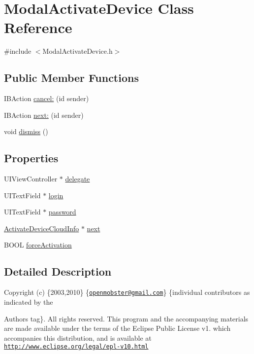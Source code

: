 \hypertarget{interface_modal_activate_device}{
\section{\-Modal\-Activate\-Device \-Class \-Reference}
\label{interface_modal_activate_device}
}


{\ttfamily \#include $<$\-Modal\-Activate\-Device.\-h$>$}

\subsection*{\-Public \-Member \-Functions}
\begin{DoxyCompactItemize}
\item 
\-I\-B\-Action \hyperlink{interface_modal_activate_device_aa6a7dcf6e0b7b5464b1462e3bd6d689f}{cancel\-:} (id sender)
\item 
\-I\-B\-Action \hyperlink{interface_modal_activate_device_a881ebe114bb256df2fab429ffab1f8f5}{next\-:} (id sender)
\item 
void \hyperlink{interface_modal_activate_device_a4b940ae1ba76f0a7e8855e723da1c9c6}{dismiss} ()
\end{DoxyCompactItemize}
\subsection*{\-Properties}
\begin{DoxyCompactItemize}
\item 
\-U\-I\-View\-Controller $\ast$ \hyperlink{interface_modal_activate_device_a36d08e216273a4945612ab255a219c09}{delegate}
\item 
\-U\-I\-Text\-Field $\ast$ \hyperlink{interface_modal_activate_device_a909df9850b143a3b14c54c16ae45ca60}{login}
\item 
\-U\-I\-Text\-Field $\ast$ \hyperlink{interface_modal_activate_device_aaf0bb5384eb5a0f7e646bfcb63ef16c4}{password}
\item 
\hyperlink{interface_activate_device_cloud_info}{\-Activate\-Device\-Cloud\-Info} $\ast$ \hyperlink{interface_modal_activate_device_a9bd94759994e7438c4938020a2dc9f5f}{next}
\item 
\-B\-O\-O\-L \hyperlink{interface_modal_activate_device_ae64c63dc7e50646071a7222f918f7608}{force\-Activation}
\end{DoxyCompactItemize}


\subsection{\-Detailed \-Description}
\-Copyright (c) \{2003,2010\} \{\href{mailto:openmobster@gmail.com}{\tt openmobster@gmail.\-com}\} \{individual contributors as indicated by the \begin{DoxyAuthor}{\-Authors}
tag\}. \-All rights reserved. \-This program and the accompanying materials are made available under the terms of the \-Eclipse \-Public \-License v1. which accompanies this distribution, and is available at \href{http://www.eclipse.org/legal/epl-v10.html}{\tt http\-://www.\-eclipse.\-org/legal/epl-\/v10.\-html} 
\end{DoxyAuthor}


